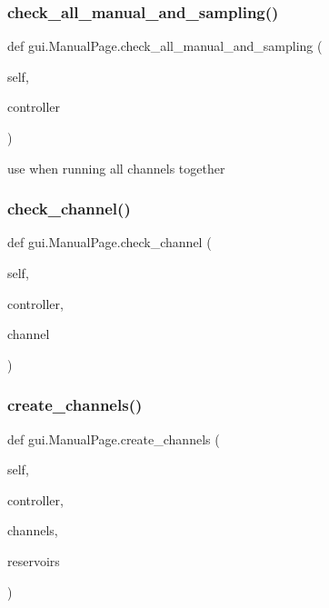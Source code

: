 \subsubsection{\texorpdfstring{check\_all\_manual\_and\_sampling()}{check\_all\_manual\_and\_sampling()}}
{\footnotesize\ttfamily def gui.\+Manual\+Page.\+check\+\_\+all\+\_\+manual\+\_\+and\+\_\+sampling (\begin{DoxyParamCaption}\item[{}]{self,  }\item[{}]{controller }\end{DoxyParamCaption})}

\begin{DoxyVerb}use when running all channels together
\end{DoxyVerb}
 \mbox{\label{classgui_1_1_manual_page_a2b9736f35eed9710bbb1a40be20bc21a}} 
\subsubsection{\texorpdfstring{check\_channel()}{check\_channel()}}
{\footnotesize\ttfamily def gui.\+Manual\+Page.\+check\+\_\+channel (\begin{DoxyParamCaption}\item[{}]{self,  }\item[{}]{controller,  }\item[{}]{channel }\end{DoxyParamCaption})}

\mbox{\label{classgui_1_1_manual_page_acc5098f07ab29863867f98a11d314451}} 
\subsubsection{\texorpdfstring{create\_channels()}{create\_channels()}}
{\footnotesize\ttfamily def gui.\+Manual\+Page.\+create\+\_\+channels (\begin{DoxyParamCaption}\item[{}]{self,  }\item[{}]{controller,  }\item[{}]{channels,  }\item[{}]{reservoirs }\end{DoxyParamCaption})}


